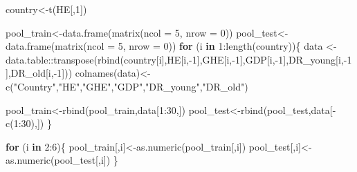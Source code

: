 \documentclass[
]{article}
\newenvironment{Shaded}{\begin{snugshade}}{\end{snugshade}}
\newcommand{\AttributeTok}[1]{\textcolor[rgb]{0.77,0.63,0.00}{#1}}
\newcommand{\ControlFlowTok}[1]{\textcolor[rgb]{0.13,0.29,0.53}{\textbf{#1}}}
\newcommand{\DecValTok}[1]{\textcolor[rgb]{0.00,0.00,0.81}{#1}}
\newcommand{\FunctionTok}[1]{\textcolor[rgb]{0.00,0.00,0.00}{#1}}
\newcommand{\NormalTok}[1]{#1}
\newcommand{\OtherTok}[1]{\textcolor[rgb]{0.56,0.35,0.01}{#1}}
\newcommand{\SpecialCharTok}[1]{\textcolor[rgb]{0.00,0.00,0.00}{#1}}
\newcommand{\StringTok}[1]{\textcolor[rgb]{0.31,0.60,0.02}{#1}}
\begin{document}
\begin{Shaded}
\begin{Highlighting}[]
\NormalTok{country}\OtherTok{\textless{}{-}}\FunctionTok{t}\NormalTok{(HE[,}\DecValTok{1}\NormalTok{])}

\NormalTok{pool\_train}\OtherTok{\textless{}{-}}\FunctionTok{data.frame}\NormalTok{(}\FunctionTok{matrix}\NormalTok{(}\AttributeTok{ncol =} \DecValTok{5}\NormalTok{, }\AttributeTok{nrow =} \DecValTok{0}\NormalTok{))}
\NormalTok{pool\_test}\OtherTok{\textless{}{-}}\FunctionTok{data.frame}\NormalTok{(}\FunctionTok{matrix}\NormalTok{(}\AttributeTok{ncol =} \DecValTok{5}\NormalTok{, }\AttributeTok{nrow =} \DecValTok{0}\NormalTok{))}
\ControlFlowTok{for}\NormalTok{ (i }\ControlFlowTok{in} \DecValTok{1}\SpecialCharTok{:}\FunctionTok{length}\NormalTok{(country))\{}
\NormalTok{  data }\OtherTok{\textless{}{-}}\NormalTok{data.table}\SpecialCharTok{::}\FunctionTok{transpose}\NormalTok{(}\FunctionTok{rbind}\NormalTok{(country[i],HE[i,}\SpecialCharTok{{-}}\DecValTok{1}\NormalTok{],GHE[i,}\SpecialCharTok{{-}}\DecValTok{1}\NormalTok{],GDP[i,}\SpecialCharTok{{-}}\DecValTok{1}\NormalTok{],DR\_young[i,}\SpecialCharTok{{-}}\DecValTok{1}\NormalTok{],DR\_old[i,}\SpecialCharTok{{-}}\DecValTok{1}\NormalTok{]))}
  \FunctionTok{colnames}\NormalTok{(data)}\OtherTok{\textless{}{-}}\FunctionTok{c}\NormalTok{(}\StringTok{"Country"}\NormalTok{,}\StringTok{"HE"}\NormalTok{,}\StringTok{"GHE"}\NormalTok{,}\StringTok{"GDP"}\NormalTok{,}\StringTok{"DR\_young"}\NormalTok{,}\StringTok{"DR\_old"}\NormalTok{)}
  
\NormalTok{  pool\_train}\OtherTok{\textless{}{-}}\FunctionTok{rbind}\NormalTok{(pool\_train,data[}\DecValTok{1}\SpecialCharTok{:}\DecValTok{30}\NormalTok{,])}
\NormalTok{  pool\_test}\OtherTok{\textless{}{-}}\FunctionTok{rbind}\NormalTok{(pool\_test,data[}\SpecialCharTok{{-}}\FunctionTok{c}\NormalTok{(}\DecValTok{1}\SpecialCharTok{:}\DecValTok{30}\NormalTok{),])}
\NormalTok{\}}

\ControlFlowTok{for}\NormalTok{ (i }\ControlFlowTok{in} \DecValTok{2}\SpecialCharTok{:}\DecValTok{6}\NormalTok{)\{}
\NormalTok{  pool\_train[,i]}\OtherTok{\textless{}{-}}\FunctionTok{as.numeric}\NormalTok{(pool\_train[,i])}
\NormalTok{  pool\_test[,i]}\OtherTok{\textless{}{-}}\FunctionTok{as.numeric}\NormalTok{(pool\_test[,i])}
\NormalTok{\}}


\end{Highlighting}
\end{Shaded}
\end{document}
